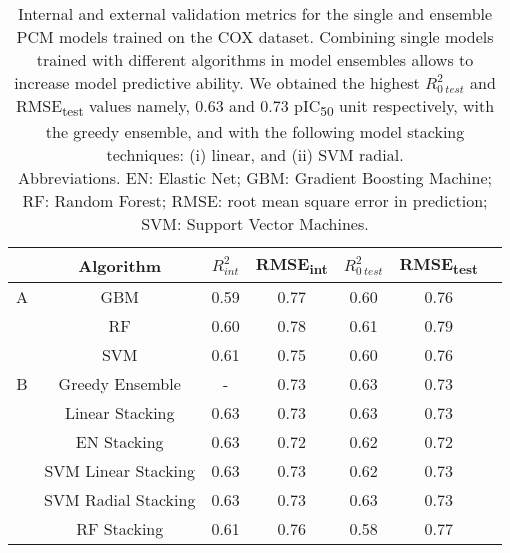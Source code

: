 \begin{table}[!htb]
\centering
\begin{tabular}[0.5width=\textwidth]{cccccc p{1cm}}
\hline
& Algorithm & $R^{2}_{int}$ & RMSE\textsubscript{int} & $R^{2}_{0\ test}$ & RMSE\textsubscript{test}\\
\hline
A &  GBM & 0.59 & 0.77 & 0.60 & 0.76 \\
 &  RF & 0.60 & 0.78 & 0.61 & 0.79 \\
 &  SVM & 0.61 & 0.75 & 0.60 & 0.76 \\
\hline
B & Greedy Ensemble  & - & 0.73  & 0.63 & 0.73 \\
 &  Linear Stacking & 0.63 & 0.73 &  0.63 & 0.73 \\
 &  EN Stacking & 0.63  & 0.72 & 0.62 & 0.72  \\
 &  SVM Linear Stacking &0.63 & 0.73 & 0.62 & 0.73 \\
 &  SVM Radial Stacking & 0.63 & 0.73 & 0.63 & 0.73 \\
 &  RF Stacking & 0.61 & 0.76 & 0.58 & 0.77 \\
\hline
\end{tabular}
\caption{Internal and external validation metrics for the single and ensemble PCM models trained on the COX dataset. 
Combining single models trained with different algorithms in model ensembles allows to increase model predictive ability.
We obtained the highest $R^{2}_{0\ test}$ and RMSE\textsubscript{test} values namely, 0.63 and 0.73 pIC\textsubscript{50} unit respectively, 
with the greedy ensemble, and with the following model stacking techniques:
(i) linear, and (ii) SVM radial.\\
Abbreviations.
EN: Elastic Net; 
GBM: Gradient Boosting Machine;
RF: Random Forest;
RMSE: root mean square error in prediction;
SVM: Support Vector Machines.}
\label{tab:resultsCOX}
\end{table}
